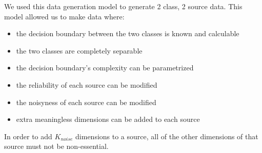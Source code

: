 \documentclass{article}
\begin{document}
We used this data generation model to generate 2 class, 2 source data. This
model allowed us to make data where:
\begin{itemize}
    \item the decision boundary between the two classes is known and calculable
    \item the two classes are completely separable
    \item the decision boundary's complexity can be parametrized
    \item the reliability of each source can be modified
    \item the noisyness of each source can be modified
    \item extra meaningless dimensions can be added to each source
\end{itemize}

In order to add $K_{noise}$ dimensions to a source, all of the other dimensions
of that source must not be non-essential.
\end{document}
